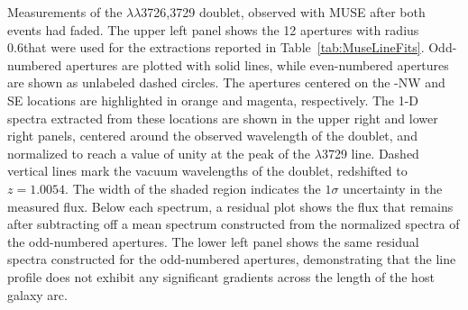 \label{fig:MUSEOIISequence}
Measurements of the  $\lambda\lambda$3726,3729 doublet, observed
with MUSE after both \spock events had faded.  The upper left panel
shows the 12 apertures with radius 0.6\arcsec that were used for the
extractions reported in Table~\ref{tab:MuseLineFits}.  Odd-numbered
apertures are plotted with solid lines, while even-numbered apertures
are shown as unlabeled dashed circles.  The apertures centered on
the \spock-NW and SE locations are highlighted in orange and magenta,
respectively.  The 1-D spectra extracted from these \spock locations
are shown in the upper right and lower right panels, centered around
the observed wavelength of the  doublet, and
normalized to reach a value of unity at the peak of the $\lambda$3729
line.  Dashed vertical lines mark the vacuum wavelengths of the
doublet, redshifted to $z=1.0054$. The width of the shaded region
indicates the $1\sigma$ uncertainty in the measured flux.  Below each
spectrum, a residual plot shows the flux that remains after
subtracting off a mean spectrum constructed from the normalized
spectra of the odd-numbered apertures.  The lower left panel shows the
same residual spectra constructed for the odd-numbered apertures,
demonstrating that the  line profile does not exhibit
any significant gradients across the length of the host galaxy arc.

